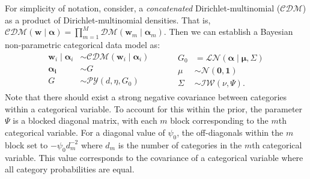   For simplicity of notation, consider, a \emph{concatenated} Dirichlet-multinomial 
    ($\mathcal{CDM}$) as a product of Dirichlet-multinomial densities.  That is, 
    $\mathcal{CDM}(\bm{w}\mid\bm{\alpha}) = 
        \prod_{m = 1}^M\mathcal{DM}(\bm{w}_m\mid\bm{\alpha}_m)$.
    Then we can establish a Bayesian non-parametric categorical data model as:
  \begin{equation}
    \label{eqn:modelcat}
    \begin{aligned}
      \bm{w}_i \mid \bm{\alpha}_i &\sim \mathcal{CDM}\left(\bm{w}_i\mid\bm{\alpha}_i\right)\\
      \bm{\alpha_i} &\sim G\\
      G &\sim \mathcal{PY}\left(d, \eta, G_0\right)\\
    \end{aligned}
    ~\hspace{1cm}
    \begin{aligned}
    G_0 &= \mathcal{LN}\left(\bm{\alpha}\mid\bm{\mu},\Sigma\right)\\
    \mu &\sim \mathcal{N}\left(\bm{0},\bm{1}\right)\\
    \Sigma &\sim \mathcal{IW}\left(\nu, \Psi\right).
    \end{aligned}
  \end{equation}
  Note that there should exist a strong negative covariance between categories 
  within a categorical variable.  To account for this within the prior, the 
  parameter $\Psi$ is a blocked diagonal matrix, with each $m$ block 
  corresponding to the $m$th categorical variable.  For a diagonal value of 
  $\psi_0$, the off-diagonals within the $m$ block set to $-\psi_0 d_m^{-2}$ 
  where $d_m$ is the number of categories in the $m$th categorical variable.
  This value corresponds to the covariance of a categorical variable where all 
  category probabilities are equal.

